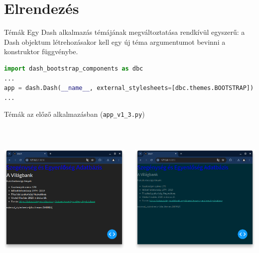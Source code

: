 \documentclass[english, aspectratio=169]{beamer}
\makeatletter
\let\origtableofcontents=\tableofcontents
\def\tableofcontents{\@ifnextchar[{\origtableofcontents}{\gobbletableofcontents}}
\def\gobbletableofcontents#1{\origtableofcontents}
\makeatother
\begin{document}
\section{Elrendezés}

\begin{frame}{}
	\tableofcontents[currentsection]
\end{frame}

\begin{frame}[fragile]{Témák}
Egy Dash alkalmazás témájának megváltoztatása rendkívül egyszerű: a Dash objektum létrehozásakor kell egy új téma argumentumot bevinni a konstruktor függvénybe.\par\medskip
\begin{lstlisting}[language=python]
import dash_bootstrap_components as dbc
...
app = dash.Dash(__name__, external_stylesheets=[dbc.themes.BOOTSTRAP])
...
\end{lstlisting}
\end{frame}

\begin{frame}{Témák az előző alkalmazásban (\texttt{app\_v1\_3.py})}
	\begin{columns}
		\begin{column}{.5\textwidth}
			\begin{center}
				\includegraphics[width=7cm, height=7cm, keepaspectratio]{images/dash_7.png}
			\end{center}
		\end{column}
		\begin{column}{.5\textwidth}
			\begin{center}
				\includegraphics[width=7cm, height=7cm, keepaspectratio]{images/dash_8.png}
			\end{center}
		\end{column}
	\end{columns}
\end{frame}
\end{document}
